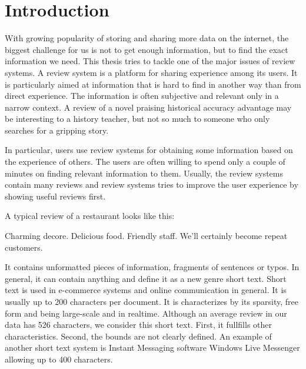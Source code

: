 \chapter*{Introduction}



With growing popularity of storing and sharing more data on the internet, the biggest challenge
for us is not to get enough information, but to find the exact information we need.
This thesis tries to tackle one of the major issues of review systems.
A review system is a platform for sharing experience among its users.
It is particularly aimed at information that is hard to find in another way than from direct experience.
The information is often subjective and relevant only in a narrow context.
A review of a novel praising historical accuracy advantage may be interesting to a history teacher,
but not so much to someone who only searches for a gripping story.

In particular, users use review systems for obtaining some information based on the experience of others.
The users are often willing to spend only a couple of minutes on finding relevant information to them.
Usually, the review systems contain many reviews and review systems tries to improve the user experience by showing useful reviews first.

A typical review of a restaurant looks like this:

\begin{code}
Charming decore. Delicious food. Friendly staff.
We'll certainly become repeat customers.
\end{code}

It contains unformatted pieces of information, fragments of sentences or typos.
In general, it can contain anything and \citet{Song14} define it as a new genre short text.
Short text is used in e-commerce systems and online communication in general.
It is usually up to 200 characters per document.
It is characterizes by its sparsity, free form and being large-scale and in realtime.
Although an average review in our data has 526 characters, we consider this short text.
First, it fullfills other characteristics.
Second, the bounds are not clearly defined.
An example of another short text system is Instant Messaging software Windows Live Messenger allowing up to 400 characters.

